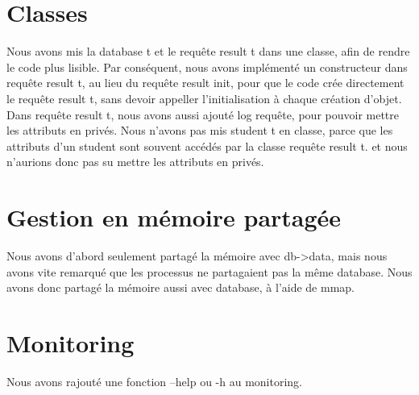 \documentclass[utf8]{article}
\begin{document}
\section{Classes}
\indent{}
\par
Nous avons mis la database t et le requête result t dans une classe, afin de rendre le code plus lisible. Par conséquent,
nous avons implémenté un constructeur dans requête result t, au lieu du requête result init, pour que le code
crée directement le requête result t, sans devoir appeller l'initialisation à chaque création d'objet.
Dans requête result t, nous avons aussi ajouté log requête, pour pouvoir mettre les attributs en privés.
Nous n'avons pas mis student t en classe, parce que les attributs d'un student sont souvent accédés par la classe requête result t.
et nous n'aurions donc pas su mettre les attributs en privés.
\par

\section{Gestion en mémoire partagée}
\indent{}
\par
Nous avons d'abord seulement partagé la mémoire avec db->data, mais nous avons vite remarqué que les processus
ne partagaient pas la même database. Nous avons donc partagé la mémoire aussi avec database, à l'aide de mmap.
\par

\section{Monitoring}
\indent{}
\par
Nous avons rajouté une fonction --help ou -h au monitoring.

\par
\end{document}
